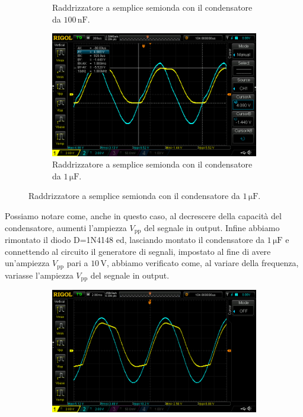 \documentclass[a4paper]{article}
\begin{document}
{{\begin{figure}[h!]
\begin{subfigure}{0.4\textwidth}
						\caption{Raddrizzatore a semplice semionda con il condensatore da $ 100 \, \mathrm{nF} $.}
					\end{subfigure}
					\begin{subfigure}{1\textwidth}
						\centering
						\includegraphics[scale=0.3]{raddrizzatoreASempliceSemiondaDiodoDiZener1micro}
						\caption{Raddrizzatore a semplice semionda con il condensatore da $ 1 \, \mathrm{\mu F} $.}
					\end{subfigure}
					\label{fig:raddrizzatoreASempliceSemiondaDiodoDiZener}
				\end{figure}
				\newpage
				Possiamo notare come, anche in questo caso, al decrescere della capacità del condensatore, aumenti l'ampiezza $ V_{\mathrm{pp}} $ del segnale in output.
				\newline
				Infine abbiamo rimontato il diodo D=1N4148 ed, lasciando montato il condensatore da $ 1 \, \mathrm{\mu F} $ e connettendo al circuito il generatore di segnali, impostato al fine di avere un'ampiezza $ V_{\mathrm{pp}} $ pari a $ 10 \, \mathrm{V} $, abbiamo verificato come, al variare della frequenza, variasse l'ampiezza $ V_{\mathrm{pp}} $ del segnale in output.
				\begin{figure}[h!]
					\centering
					\begin{subfigure}{0.4\textwidth}
						\centering
						\includegraphics[scale=0.2]{raddrizzatoreASempliceSemionda1micro100}

\end{subfigure}
\end{figure}}}
\end{document}
